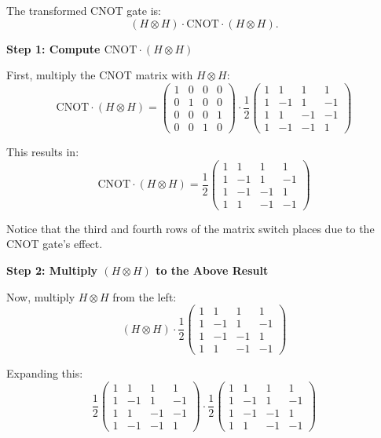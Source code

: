 The transformed CNOT gate is:
\[
  (H \otimes H) \cdot \text{CNOT} \cdot (H \otimes H).
\]

\vspace{0.3cm}

\textbf{Step 1: Compute $\text{CNOT} \cdot (H \otimes H)$}

First, multiply the CNOT matrix with $H \otimes H$:
\[
  \text{CNOT} \cdot (H \otimes H) = \begin{pmatrix}
    1 & 0 & 0 & 0 \\
    0 & 1 & 0 & 0 \\
    0 & 0 & 0 & 1 \\
    0 & 0 & 1 & 0
    \end{pmatrix} \cdot \frac{1}{2} \begin{pmatrix}
    1 & 1 & 1 & 1 \\
    1 & -1 & 1 & -1 \\
    1 & 1 & -1 & -1 \\
    1 & -1 & -1 & 1
  \end{pmatrix}
\]

This results in:
\[
  \text{CNOT} \cdot (H \otimes H) = \frac{1}{2} \begin{pmatrix}
    1 & 1 & 1 & 1 \\
    1 & -1 & 1 & -1 \\
    1 & -1 & -1 & 1 \\
    1 & 1 & -1 & -1
  \end{pmatrix}
\]

Notice that the third and fourth rows of the matrix switch places due to the
CNOT gate's effect.

\vspace{0.3cm}

\textbf{Step 2: Multiply $(H \otimes H)$ to the Above Result}

Now, multiply $H \otimes H$ from the left:
\[
  (H \otimes H) \cdot \frac{1}{2} \begin{pmatrix}
    1 & 1 & 1 & 1 \\
    1 & -1 & 1 & -1 \\
    1 & -1 & -1 & 1 \\
    1 & 1 & -1 & -1
  \end{pmatrix}
\]

Expanding this:
\[
  \frac{1}{2} \begin{pmatrix}
    1 & 1 & 1 & 1 \\
    1 & -1 & 1 & -1 \\
    1 & 1 & -1 & -1 \\
    1 & -1 & -1 & 1
    \end{pmatrix} \cdot \frac{1}{2} \begin{pmatrix}
    1 & 1 & 1 & 1 \\
    1 & -1 & 1 & -1 \\
    1 & -1 & -1 & 1 \\
    1 & 1 & -1 & -1
  \end{pmatrix}
\]

